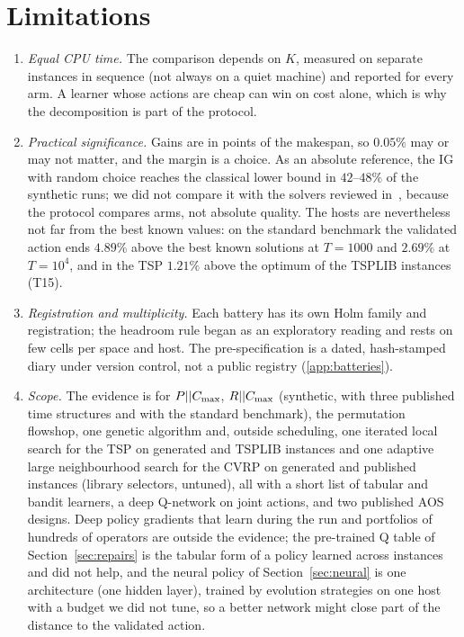\section{Limitations}
\label{sec:limitations}
\begin{enumerate}[label=(\roman*)]
\item \emph{Equal CPU time.} The comparison depends on $K$, measured on separate instances in sequence (not always on a quiet machine) and reported for every arm. A learner whose actions are cheap can win on cost alone, which is why the decomposition is part of the protocol.
\item \emph{Practical significance.} Gains are in points of the makespan, so $0.05\%$ may or may not matter, and the margin is a choice. As an absolute reference, the IG with random choice reaches the classical lower bound in $42$--$48\%$ of the synthetic runs; we did not compare it with the solvers reviewed in~\cite{OstojicEtAl2025}, because the protocol compares arms, not absolute quality. The hosts are nevertheless not far from the best known values: on the standard benchmark the validated action ends $4.89\%$ above the best known solutions at $T=1000$ and $2.69\%$ at $T=10^4$, and in the TSP $1.21\%$ above the optimum of the TSPLIB instances (T15).
\item \emph{Registration and multiplicity.} Each battery has its own Holm family and registration; the headroom rule began as an exploratory reading and rests on few cells per space and host. The pre-specification is a dated, hash-stamped diary under version control, not a public registry (\ref{app:batteries}).
\item \emph{Scope.} The evidence is for $P||C_{\max}$, $R||C_{\max}$ (synthetic, with three published time structures and with the standard benchmark), the permutation flowshop, one genetic algorithm and, outside scheduling, one iterated local search for the TSP on generated and TSPLIB instances and one adaptive large neighbourhood search for the CVRP on generated and published instances (library selectors, untuned), all with a short list of tabular and bandit learners, a deep Q-network on joint actions, and two published AOS designs. Deep policy gradients that learn during the run and portfolios of hundreds of operators are outside the evidence; the pre-trained Q table of Section~\ref{sec:repairs} is the tabular form of a policy learned across instances and did not help, and the neural policy of Section~\ref{sec:neural} is one architecture (one hidden layer), trained by evolution strategies on one host with a budget we did not tune, so a better network might close part of the distance to the validated action.

\end{enumerate}
